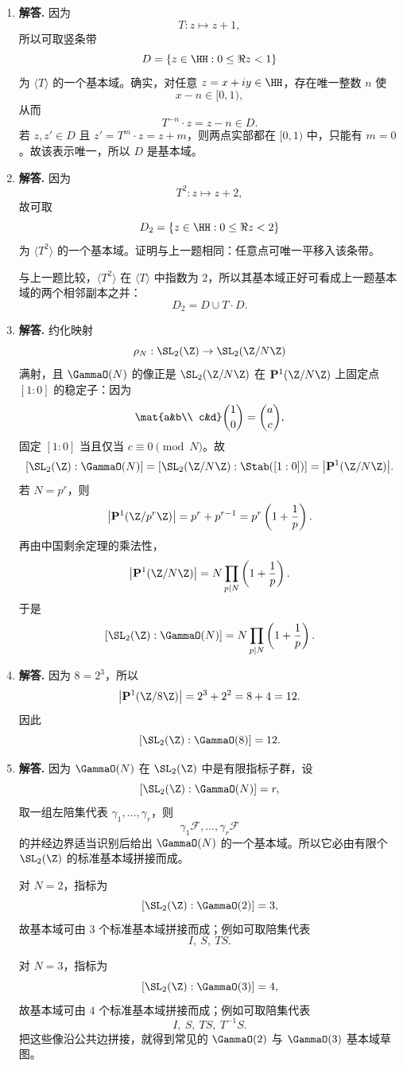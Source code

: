 \begin{enumerate}[label=\textbf{\arabic*.}, leftmargin=*, itemsep=1em]
\item \textbf{解答.} 因为
\[
T:z\mapsto z+1,
\]
所以可取竖条带
\[
D=\{z\in\HH:0\le \Re z<1\}
\]
为 $\langle T\rangle$ 的一个基本域。确实，对任意 $z=x+iy\in\HH$，存在唯一整数 $n$ 使
\[
x-n\in[0,1),
\]
从而
\[
T^{-n}\cdot z=z-n\in D.
\]
若 $z,z'\in D$ 且 $z'=T^m\cdot z=z+m$，则两点实部都在 $[0,1)$ 中，只能有 $m=0$。故该表示唯一，所以 $D$ 是基本域。

\item \textbf{解答.} 因为
\[
T^2:z\mapsto z+2,
\]
故可取
\[
D_2=\{z\in\HH:0\le \Re z<2\}
\]
为 $\langle T^2\rangle$ 的一个基本域。证明与上一题相同：任意点可唯一平移入该条带。

与上一题比较，$\langle T^2\rangle$ 在 $\langle T\rangle$ 中指数为 $2$，所以其基本域正好可看成上一题基本域的两个相邻副本之并：
\[
D_2=D\cup T\cdot D.
\]

\item \textbf{解答.} 约化映射
\[
\rho_N:\SL_2(\Z)\to \SL_2(\Z/N\Z)
\]
满射，且 $\GammaO(N)$ 的像正是 $\SL_2(\Z/N\Z)$ 在 $\mathbf P^1(\Z/N\Z)$ 上固定点 $[1:0]$ 的稳定子：因为
\[
\mat{a&b\\ c&d}\binom10=\binom ac,
\]
固定 $[1:0]$ 当且仅当 $c\equiv0\pmod N$。故
\[
[\SL_2(\Z):\GammaO(N)]
=[\SL_2(\Z/N\Z):\Stab([1:0])]
=\bigl|\mathbf P^1(\Z/N\Z)\bigr|.
\]
若 $N=p^r$，则
\[
\bigl|\mathbf P^1(\Z/p^r\Z)\bigr|=p^r+p^{r-1}=p^r\left(1+\frac1p\right).
\]
再由中国剩余定理的乘法性，
\[
\bigl|\mathbf P^1(\Z/N\Z)\bigr|
=N\prod_{p\mid N}\left(1+\frac1p\right).
\]
于是
\[
[\SL_2(\Z):\GammaO(N)]
=N\prod_{p\mid N}\left(1+\frac1p\right).
\]

\item \textbf{解答.} 因为 $8=2^3$，所以
\[
\bigl|\mathbf P^1(\Z/8\Z)\bigr|
=2^3+2^2=8+4=12.
\]
因此
\[
[\SL_2(\Z):\GammaO(8)]=12.
\]

\item \textbf{解答.} 因为 $\GammaO(N)$ 在 $\SL_2(\Z)$ 中是有限指标子群，设
\[
[\SL_2(\Z):\GammaO(N)]=r,
\]
取一组左陪集代表 $\gamma_1,\dots,\gamma_r$，则
\[
\gamma_1\mathcal F,\dots,\gamma_r\mathcal F
\]
的并经边界适当识别后给出 $\GammaO(N)$ 的一个基本域。所以它必由有限个 $\SL_2(\Z)$ 的标准基本域拼接而成。

对 $N=2$，指标为
\[
[\SL_2(\Z):\GammaO(2)]=3,
\]
故基本域可由 $3$ 个标准基本域拼接而成；例如可取陪集代表
\[
I,\ S,\ TS.
\]

对 $N=3$，指标为
\[
[\SL_2(\Z):\GammaO(3)]=4,
\]
故基本域可由 $4$ 个标准基本域拼接而成；例如可取陪集代表
\[
I,\ S,\ TS,\ T^{-1}S.
\]
把这些像沿公共边拼接，就得到常见的 $\GammaO(2)$ 与 $\GammaO(3)$ 基本域草图。


\end{enumerate}
